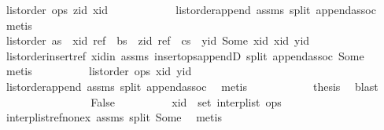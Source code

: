 \begin{isabellebody}
\ {\isachardoublequoteopen}list{\isacharunderscore}order\ ops\ zid\ xid{\isachardoublequoteclose}\isanewline
\ \ \ \ \ \ \ \ \ \ \isamarkupfalse%
\ list{\isacharunderscore}order{\isacharunderscore}append\ assms{\isacharparenleft}{}{\isacharparenright}\ split\ append{\isachardot}assoc\ \isamarkupfalse%
\ metis\isanewline
\ \ \ \ \ \ \ \ \isamarkupfalse%
\ \isamarkupfalse%
\ {\isachardoublequoteopen}list{\isacharunderscore}order\ {\isacharparenleft}as\ {\isacharat}\ {\isacharbrackleft}{\isacharparenleft}xid{\isacharcomma}\ ref{\isacharparenright}{\isacharbrackright}\ {\isacharat}\ bs\ {\isacharat}\ {\isacharbrackleft}{\isacharparenleft}zid{\isacharcomma}\ ref{\isacharparenright}{\isacharbrackright}\ {\isacharat}\ cs\ {\isacharat}\ {\isacharbrackleft}{\isacharparenleft}yid{\isacharcomma}\ Some\ xid{\isacharparenright}{\isacharbrackright}{\isacharparenright}\ xid\ yid{\isachardoublequoteclose}\isanewline
\ \ \ \ \ \ \ \ \ \ \isamarkupfalse%
\ list{\isacharunderscore}order{\isacharunderscore}insert{\isacharunderscore}ref\ xid{\isacharunderscore}in\ assms{\isacharparenleft}{}{\isacharparenright}\ insert{\isacharunderscore}ops{\isacharunderscore}appendD\ split\ append{\isachardot}assoc\ Some\ \isamarkupfalse%
\ metis\isanewline
\ \ \ \ \ \ \ \ \isamarkupfalse%
\ {\isachardoublequoteopen}list{\isacharunderscore}order\ ops\ xid\ yid{\isachardoublequoteclose}\isanewline
\ \ \ \ \ \ \ \ \ \ \isamarkupfalse%
\ list{\isacharunderscore}order{\isacharunderscore}append\ assms{\isacharparenleft}{}{\isacharparenright}\ split\ append{\isachardot}assoc\ \isamarkupfalse%
\ metis\isanewline
\ \ \ \ \ \ \ \ \isamarkupfalse%
\ \isamarkupfalse%
\ {\isacharquery}thesis\ \isamarkupfalse%
\ blast\isanewline
\ \ \ \ \ \ \isamarkupfalse%
\isanewline
\ \ \ \ \ \ \ \ \isamarkupfalse%
\ False\isanewline
\ \ \ \ \ \ \ \ \isamarkupfalse%
\ {\isachardoublequoteopen}xid\ {\isasymnotin}\ set\ {\isacharparenleft}interp{\isacharunderscore}list\ ops{\isacharparenright}{\isachardoublequoteclose}\isanewline
\ \ \ \ \ \ \ \ \ \ \isamarkupfalse%
\ interp{\isacharunderscore}list{\isacharunderscore}ref{\isacharunderscore}nonex\ assms{\isacharparenleft}{}{\isacharparenright}\ split\ Some\ \isamarkupfalse%
\ metis\isanewline
\ \ \ \ \ \ \ \ \isamarkupfalse%

\end{isabellebody}
